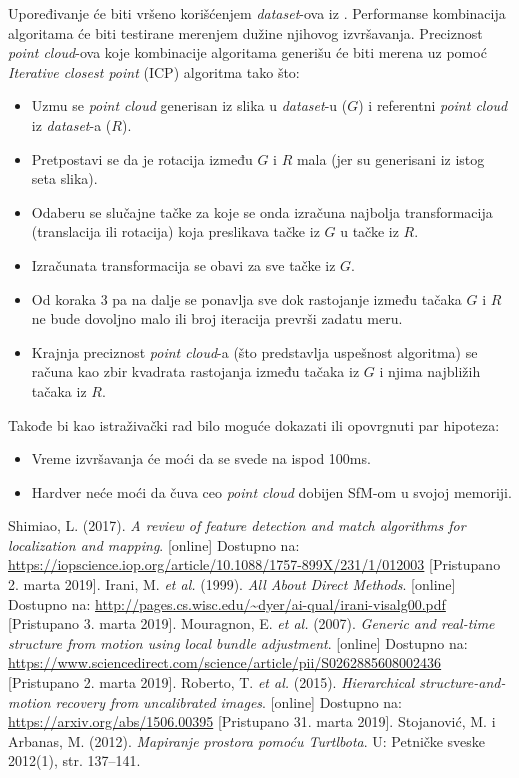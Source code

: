 \documentclass{article}
\begin{document}
    Upoređivanje će biti vršeno korišćenjem \textit{dataset}-ova iz \cite{dataset}. Performanse kombinacija algoritama će biti testirane merenjem dužine njihovog izvršavanja. Preciznost \textit{point cloud}-ova koje kombinacije algoritama generišu će biti merena uz pomoć \textit{Iterative closest point} (ICP) algoritma tako što\cite{stojke}:
    \begin{itemize}
        \item Uzmu se \textit{point cloud} generisan iz slika u \textit{dataset}-u ($G$) i referentni \textit{point cloud} iz \textit{dataset}-a ($R$).
        \item Pretpostavi se da je rotacija između $G$ i $R$ mala (jer su generisani iz istog seta slika).
        \item Odaberu se slučajne tačke za koje se onda izračuna najbolja transformacija (translacija ili rotacija) koja preslikava tačke iz $G$ u tačke iz $R$.
        \item Izračunata transformacija se obavi za sve tačke iz $G$.
        \item Od koraka 3 pa na dalje se ponavlja sve dok rastojanje između tačaka $G$ i $R$ ne bude dovoljno malo ili broj iteracija prevrši zadatu meru.
        \item Krajnja preciznost \textit{point cloud}-a (što predstavlja uspešnost algoritma) se računa kao zbir kvadrata rastojanja između tačaka iz $G$ i njima najbližih tačaka iz $R$.
    \end{itemize}
    Takođe bi kao istraživački rad bilo moguće dokazati ili opovrgnuti par hipoteza:
    \begin{itemize}
        \item Vreme izvršavanja će moći da se svede na ispod 100ms.
        \item Hardver neće moći da čuva ceo \textit{point cloud} dobijen SfM-om u svojoj memoriji.
    \end{itemize}

\begin{thebibliography}{2}
    Shimiao, L. (2017). \textit{A review of feature detection and match algorithms for localization and mapping}. [online] Dostupno na: \url{https://iopscience.iop.org/article/10.1088/1757-899X/231/1/012003} [Pristupano 2. marta 2019].
    Irani, M. \textit{et al.} (1999). \textit{All About Direct Methods}. [online] Dostupno na: \url{http://pages.cs.wisc.edu/~dyer/ai-qual/irani-visalg00.pdf} [Pristupano 3. marta 2019].
    Mouragnon, E. \textit{et al.} (2007). \textit{Generic and real-time structure from motion using local bundle adjustment}. [online] Dostupno na: \url{https://www.sciencedirect.com/science/article/pii/S0262885608002436} [Pristupano 2. marta 2019].
    Roberto, T. \textit{et al.} (2015). \textit{Hierarchical structure-and-motion recovery from uncalibrated images}. [online] Dostupno na: \url{https://arxiv.org/abs/1506.00395} [Pristupano 31. marta 2019].
    Stojanović, M. i Arbanas, M. (2012). \textit{Mapiranje prostora pomoću Turtlbota}. U: Petničke sveske 2012(1), str. 137–141.
\end{thebibliography}
\end{document}
